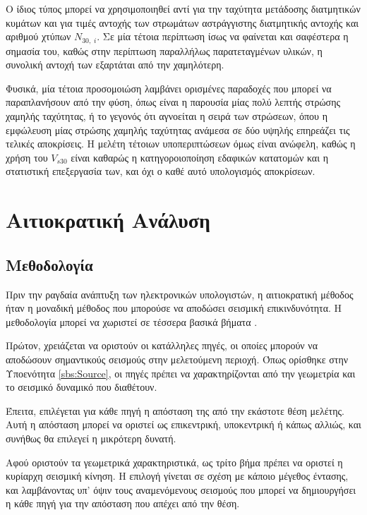 Ο ίδιος τύπος μπορεί να χρησιμοποιηθεί αντί για την ταχύτητα μετάδοσης διατμητικών κυμάτων και για τιμές αντοχής των στρωμάτων αστράγγιστης διατμητικής αντοχής και αριθμού χτύπων $N_{30,\;i}$. Σε μία τέτοια περίπτωση ίσως να φαίνεται και σαφέστερα η σημασία του, καθώς στην περίπτωση παραλλήλως παρατεταγμένων υλικών, η συνολική αντοχή των εξαρτάται από την χαμηλότερη.

Φυσικά, μία τέτοια προσομοιώση λαμβάνει ορισμένες παραδοχές που μπορεί να παραπλανήσουν από την φύση, όπως είναι η παρουσία μίας πολύ λεπτής στρώσης χαμηλής ταχύτητας, ή το γεγονός ότι αγνοείται η σειρά των στρώσεων, όπου η εμφώλευση μίας στρώσης χαμηλής ταχύτητας ανάμεσα σε δύο υψηλής επηρεάζει τις τελικές αποκρίσεις. Η μελέτη τέτοιων υποπεριπτώσεων όμως είναι ανώφελη, καθώς η χρήση του $V_{s30}$ είναι καθαρώς η κατηγοροιοποίηση εδαφικών κατατομών και η στατιστική επεξεργασία των, και όχι ο καθέ αυτό υπολογισμός αποκρίσεων.

\section{Αιτιοκρατική Ανάλυση}

\subsection{Μεθοδολογία}

Πριν την ραγδαία ανάπτυξη των ηλεκτρονικών υπολογιστών, η αιτιοκρατική μέθοδος ήταν η μοναδική μέθοδος που μπορούσε να αποδώσει σεισμική επικινδυνότητα. Η μεθοδολογία μπορεί να χωριστεί σε τέσσερα βασικά βήματα \parencite{Reiter}.

Πρώτον, χρειάζεται να οριστούν οι κατάλληλες πηγές, οι οποίες μπορούν να αποδώσουν σημαντικούς σεισμούς στην μελετούμενη περιοχή. Όπως ορίσθηκε στην Υποενότητα \ref{sbs:Source}, οι πηγές πρέπει να χαρακτηρίζονται από την γεωμετρία και το σεισμικό δυναμικό που διαθέτουν.

Έπειτα, επιλέγεται για κάθε πηγή η απόσταση της από την εκάστοτε θέση μελέτης. Αυτή η απόσταση μπορεί να οριστεί ως επικεντρική, υποκεντρική ή κάπως αλλιώς, και συνήθως θα επιλεγεί η μικρότερη δυνατή.

Αφού οριστούν τα γεωμετρικά χαρακτηριστικά, ως τρίτο βήμα πρέπει να οριστεί η κυρίαρχη σεισμική κίνηση. Η επιλογή γίνεται σε σχέση με κάποιο μέγεθος έντασης, και λαμβάνοντας υπ' όψιν τους αναμενόμενους σεισμούς που μπορεί να δημιουργήσει η κάθε πηγή για την απόσταση που απέχει από την θέση.

